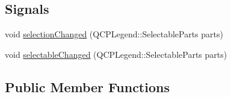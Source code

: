 \subsection*{Signals}
\begin{DoxyCompactItemize}
\item 
void \hyperlink{class_q_c_p_legend_a82c88464edac07a9eefaf3906268df3b}{selection\+Changed} (Q\+C\+P\+Legend\+::\+Selectable\+Parts parts)
\item 
void \hyperlink{class_q_c_p_legend_a8a77300fd0976d6bdd8000f4e8d114b8}{selectable\+Changed} (Q\+C\+P\+Legend\+::\+Selectable\+Parts parts)
\end{DoxyCompactItemize}
\subsection*{Public Member Functions}
